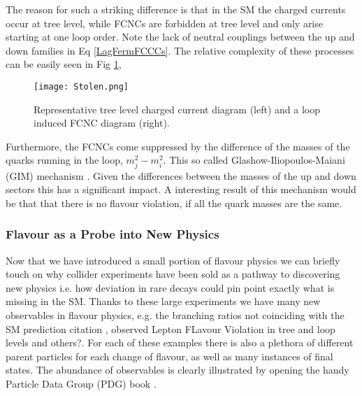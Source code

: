 \setlength{\tabcolsep}{6pt} %
\renewcommand{\arraystretch}{1} %

The reason for such a striking difference is that in the SM the charged currents occur at tree level, while FCNCs are forbidden at tree level and only arise starting at one loop order. Note the lack of neutral couplings between the up and down families in Eq \ref{LagFermFCCCs}. The relative complexity of these processes can be easily seen in Fig \ref{fig:Flavour_D_1},
%
\begin{figure}[H]
	\centering
	\texttt{[image: Stolen.png]}
	\caption{Representative tree level charged current diagram (left) and a loop induced FCNC diagram (right).}
	\label{fig:Flavour_D_1}
\end{figure}
%
%
Furthermore, the FCNCs come suppressed by the difference of the masses of the quarks running in the loop, $m^2_j-m^2_i$. This so called Glashow-Iliopoulos-Maiani (GIM) mechanism \cite{glashow1970weak}. Given the differences between the masses of the up and down sectors this has a significant impact. 
%
A interesting result of this mechanism would be that that there is no flavour violation, if all the quark masses are the same.

\subsubsection{Flavour as a Probe into New Physics}

Now that we have introduced a small portion of flavour physics we can briefly touch on why collider experiments have been sold as a pathway to discovering new physics i.e. how deviation in rare decays could pin point exactly what is missing in the SM. 
%
Thanks to these large experiments we have many new observables in flavour physics, e.g. the branching ratios not coinciding with the SM prediction {\color{blue} citation }, observed Lepton FLavour Violation in tree and loop levels \cite{Graverini2019} {\color{blue} and others?}. For each of these examples there is also a plethora of different parent particles for each change of flavour, as well as many instances of final states. 
%
The abundance of observables is clearly illustrated by opening the handy Particle Data Group (PDG) book \cite{Tanabashi2018}. 


